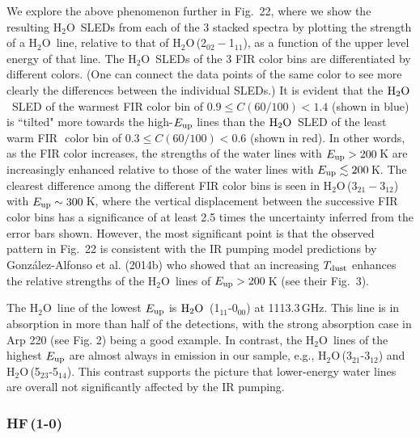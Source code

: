 \documentclass[preprint]{aastex}
\newcommand{\Water}{\mbox{${\rm H}_2{\rm O}$}}
\newcommand{\water}{\mbox{H$_2$O}}
\begin{document}
We explore the above phenomenon further in Fig.~22, where we show the resulting 
\water\ SLEDs from each of the 3 stacked spectra by plotting the strength of a 
\water\ line, relative to that of \water\,(2$_{02} - $1$_{11}$), as a function of 
the upper level energy of that line.  The \water\ SLEDs of the 3 FIR color bins are 
differentiated by different colors. (One can connect the data points of the same 
color to see more clearly the differences between the individual SLEDs.)
It is evident that the \Water\ SLED of the warmest FIR color bin 
of $0.9 \leqslant C(60/100) < 1.4$ (shown in blue) is ``tilted" more towards 
the high-$E_{\rm up}$ lines than the \Water\ SLED of the least warm FIR  color bin of $0.3 \leqslant C(60/100) < 0.6$ (shown in red). In other words, 
as the FIR color 
increases, the strengths of the water lines with $E_{\rm up} > 200$\,K are 
increasingly enhanced relative to those of the water lines with $E_{\rm up}
\lesssim 200$\,K.   The clearest difference among the different FIR color 
bins is seen in \water\,(3$_{21} - $3$_{12}$) with $E_{\rm up} \sim 300$\,K,
where the vertical displacement between the successive FIR color bins has 
a significance of at least 2.5 times the uncertainty inferred from the error
bars shown.  However, the most significant point is that the observed 
pattern in Fig.~22 is consistent with the IR pumping model predictions by 
Gonz\'alez-Alfonso et al. (2014b) who showed that an increasing $T_{\rm dust}$
enhances the relative strengths of the \water\ lines of $E_{\rm up} > 200$\,K 
(see their Fig.~3).


The \water\ line of the lowest $E_{\rm up}$ is \Water\ (1$_{11}$-0$_{00}$) 
at 1113.3\,GHz.  This line is in absorption in more than half of the detections,
with the strong absorption case in Arp 220 (see Fig. 2) being a good example.
In contrast, the \water\ lines of the highest $E_{\rm up}$ are almost always 
in emission in our sample, e.g., \water\,(3$_{21}$-3$_{12}$) and \water\,(5$_{23}$-5$_{14}$). 
This contrast supports the picture that lower-energy water lines are overall 
not significantly affected by the IR pumping. 









\subsubsection{HF\,(1-0)} \label{sec5.7.2}
\end{document}
